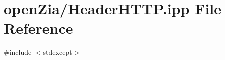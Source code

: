 \hypertarget{_header_h_t_t_p_8ipp}{}\section{open\+Zia/\+Header\+H\+T\+TP.ipp File Reference}
\label{_header_h_t_t_p_8ipp}
{\ttfamily \#include $<$stdexcept$>$}\newline

